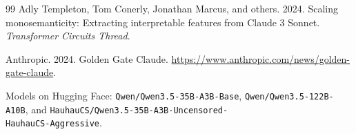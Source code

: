 \documentclass[10pt,a4paper,twocolumn]{article}
\begin{document}
\begin{thebibliography}{99}
Adly Templeton, Tom Conerly, Jonathan Marcus, and others. 2024. Scaling
monosemanticity: Extracting interpretable features from Claude 3 Sonnet.
\emph{Transformer Circuits Thread}.

Anthropic. 2024. Golden Gate Claude.
\url{https://www.anthropic.com/news/golden-gate-claude}.

Models on Hugging Face: \texttt{Qwen/Qwen3.5-35B-A3B-Base},
\texttt{Qwen/Qwen3.5-122B-A10B}, and
\texttt{HauhauCS/Qwen3.5-35B-A3B-Uncensored-}\\
\texttt{HauhauCS-Aggressive}.

\end{thebibliography}
\end{document}
